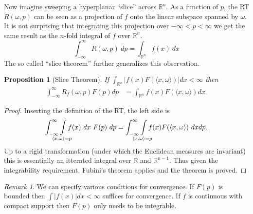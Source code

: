\documentclass{amsart}
\newtheorem{proposition}[theorem]{Proposition}
\theoremstyle{remark}
\newtheorem{remark}[theorem]{Remark}
\numberwithin{equation}{section}
\newcommand{\RR}{\mathbb{R}}
\def\mclimits_#1{\limits_{\mathclap{#1}}}
\begin{document}
Now imagine sweeping a hyperplanar ``slice'' across $\RR^n$. As a function of $p$, the RT $R(\omega, p)$ can be seen as a projection of $f$ onto the linear subspace spanned by $\omega$. It is not surprising that integrating this projection over $-\infty < p < \infty$ we get the same result as the $n$-fold integral of $f$ over $\RR^n$.
\[
    \int_{-\infty}^\infty R(\omega, p) ~dp = \int_{\RR^n} f(x) ~dx
\]
The so called ``slice theorem'' further generalizes this observation.
\begin{proposition}[Slice Theorem]
    If $\int_{\mathbb{R}^n} |f(x) F(\langle x, \omega \rangle)| dx < \infty$ then
    \begin{align}
        \label{eq:ST}
        \int_{-\infty}^\infty R_f(\omega, p) F(p) dp 
        &= \int_{\mathbb{R}^n} f(x) F(\langle x, \omega \rangle) dx.
    \end{align}
\end{proposition}

\begin{proof}
Inserting the definition of the RT, the left side is
\[
    \int_{-\infty}^\infty \int\mclimits_{\langle x, \omega \rangle = p} f(x) ~dx~ F(p) ~dp 
    = \int_{-\infty}^\infty \int\mclimits_{\langle x, \omega \rangle = p} f(x) F(\langle x, \omega \rangle) ~dx dp.
\]
Up to a rigid transformation (under which the Euclidean measures are invariant) this is essentially an itterated integral over $\RR$ and $\RR^{n-1}$. Thus given the integrability requirement, Fubini's theorem applies and the theorem is proved.
\end{proof}

\begin{remark}
We can specify various conditions for convergence. If $F(p)$ is bounded then $\int |f(x)| dx < \infty$ suffices for convergence. If $f$ is continuous with compact support then $F(p)$ only needs to be integrable.  
\end{remark}
\end{document}
